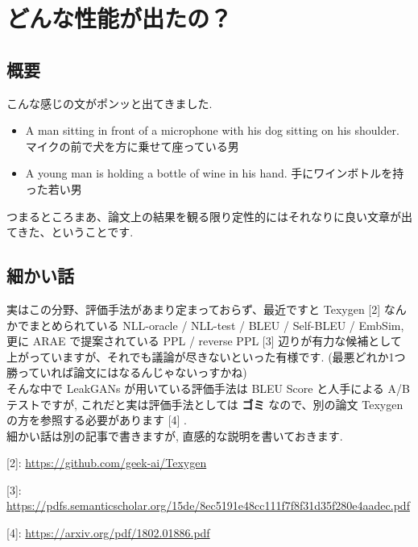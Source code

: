 \documentclass[a4paper, dvipdfmx, 10pt]{article}
\begin{document}
\section{どんな性能が出たの？}
\label{sec:org133c49c}
\subsection{概要}
\label{sec:org3a63286}
こんな感じの文がポンッと出てきました.

\begin{itemize}
\item A man sitting in front of a microphone with his dog sitting on his shoulder.
マイクの前で犬を方に乗せて座っている男
\item A young man is holding a bottle of wine in his hand.
手にワインボトルを持った若い男
\end{itemize}

つまるところまあ、論文上の結果を観る限り定性的にはそれなりに良い文章が出てきた、ということです.
\subsection{細かい話}
\label{sec:org5be6489}
実はこの分野、評価手法があまり定まっておらず、最近ですと Texygen [2] なんかでまとめられている NLL-oracle / NLL-test / BLEU / Self-BLEU / EmbSim, 更に ARAE で提案されている PPL / reverse PPL [3] 辺りが有力な候補として上がっていますが、それでも議論が尽きないといった有様です. (最悪どれか1つ勝っていれば論文にはなるんじゃないっすかね)\\

そんな中で LeakGANs が用いている評価手法は BLEU Score と人手による A/B テストですが, これだと実は評価手法としては \textbf{ゴミ} なので、別の論文 Texygen の方を参照する必要があります [4] .\\

細かい話は別の記事で書きますが, 直感的な説明を書いておきます.

[2]: \url{https://github.com/geek-ai/Texygen}

[3]: \url{https://pdfs.semanticscholar.org/15de/8ec5191e48cc111f7f8f31d35f280e4aadec.pdf}

[4]: \url{https://arxiv.org/pdf/1802.01886.pdf}
\end{document}
